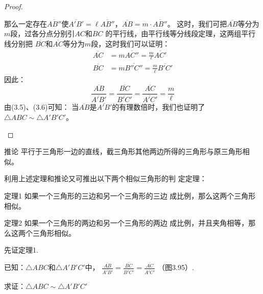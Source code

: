 \begin{proof}
\begin{enumerate}
\begin{figure}
\begin{tikzpicture}
\end{tikzpicture}
    \caption{}
\end{figure}


那么一定存在$\overline{AB''}$使$\overline{A'B'}=\ell \overline{AB''}$，$\overline{AB}=m\cdot \overline{AB''}$。
这时，我们可把$\overline{AB}$等分为$m$段，过各分点分别引$AC$和$BC$
的平行线，由平行线等分线段定理，这两组平行线分别把
$\overline{BC}$和$\overline{AC}$等分为$m$段，这时我们可以证明：
\[\begin{split}
    \overline{AC}&=m\overline{AC''}=\frac{m}{\ell}\overline{AC'}\\
    \overline{BC}&=m\overline{B''C''}=\frac{m}{\ell}\overline{B'C'}
\end{split}\]
因此：
\begin{equation}
    \frac{\overline{AB}}{\overline{A'B'}}=\frac{\overline{BC}}{\overline{B'C'}}=\frac{\overline{AC}}{\overline{A'C'}}=\frac{m}{\ell}
\end{equation}
由(3.5)、(3.6)可知：
当$\overline{AB}$是$\overline{A'B'}$的有理数倍时，我们也证明了
$\triangle ABC\sim \triangle A'B'C'$。
\end{enumerate}
\end{proof}

\begin{Deduction}{推论} 
平行于三角形一边的直线，截三角形其他两边所得的三角形与原三角形相似。
\end{Deduction}

利用上述定理和推论又可推出以下两个相似三角形的判
定定理：

\begin{Theorem}{定理1}
如果一个三角形的三边和另一个三角形的三边
成比例，那么这两个三角形相似。
\end{Theorem}

\begin{Theorem}{定理2}
如果一个三角形的两边和另一个三角形的两边
成比例，并且夹角相等，那么这两个三角形相似。
\end{Theorem}

先证定理1.

已知：$\triangle ABC$和$\triangle A'B'C'$中，
$\frac{\overline{AB}}{\overline{A'B'}}=\frac{\overline{BC}}{\overline{B'C'}}=\frac{\overline{AC}}{\overline{A'C'}}$
（图3.95）.

求证：$\triangle ABC\sim \triangle A'B'C'$


